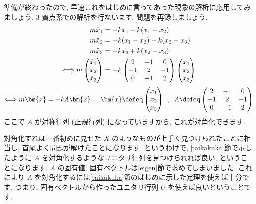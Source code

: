 \documentclass[openany, a4paper, oneside]{jsbook}
\begin{document}
準備が終わったので, 早速これをはじめに言ってあった現象の解析に応用してみましょう.
3 質点系での解析を行ないます. 問題を再録しましょう.
\begin{align}
    m\ddot{x}_{1} &= -kx_1 - k (x_1 - x_2 ) \notag \\
    m\ddot{x}_{2} &= + k (x_1 - x_2 ) - k (x_2 - x_3) \notag \\
    m\ddot{x}_{3} &= -kx_3 +k (x_2 - x_3 )  \notag \\
    \Longleftrightarrow
    m \begin{pmatrix} \ddot{x}_{1} \\ \ddot{x}_{2} \\ \ddot{x}_{3} \end{pmatrix}
    &= -k \begin{pmatrix} 2 & -1 & 0 \\ -1 & 2 & -1 \\ 0 & -1 & 2 \end{pmatrix}
    \begin{pmatrix} x_{1} \\ x_{2} \\ x_{3} \end{pmatrix} \notag
\end{align}
\begin{align}
    \Longleftrightarrow
    m \ddot{\bm{x}} = -k A \bm{x} \,\,\, , \,\,\,
    \bm{x} \defeq \begin{pmatrix} x_1 \\ x_2 \\ x_3 \end{pmatrix} \,\,\, , \,\,\,
    A \defeq \begin{pmatrix} 2 & -1 & 0 \\ -1 & 2 & -1 \\ 0 & -1 & 2 \end{pmatrix} \notag
\end{align}
ここで $A$ が対称行列 (正規行列) になっていますから, これが対角化できます.

対角化すれば一番初めに見せた $X$ のようなものが上手く見つけられたことに相当し, 首尾よく問題が解けたことになります.
というわけで, \ref{taikakuka}節で示したように $A$ を対角化するようなユニタリ行列を見つけられれば良い, ということになります.
 $A$ の固有値, 固有ベクトルは\ref{eigen}節で求めてしまいました.
これにより $A$ を対角化するには\ref{taikakuka}節のはじめに示した定理を使えば十分です.
つまり, 固有ベクトルから作ったユニタリ行列 $U$ を使えば良いということです.
\end{document}
